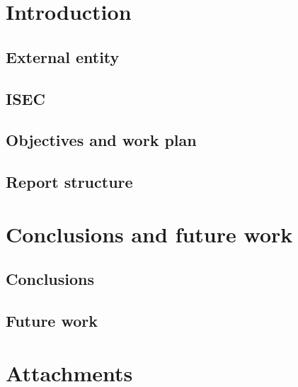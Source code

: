 \documentclass[a4paper,11pt,twoside]{article}
\begin{document}

\section{Introduction}

\subsection{External entity}

\subsection{ISEC}

\subsection{Objectives and work plan}

\subsection{Report structure}

\section{Conclusions and future work}

\subsection{Conclusions}

\subsection{Future work}

\printbibliography

\section{Attachments}
\end{document}

